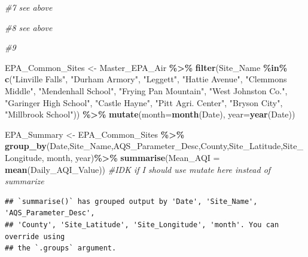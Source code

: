 \documentclass[
]{article}
\newenvironment{Shaded}{\begin{snugshade}}{\end{snugshade}}
\newcommand{\AttributeTok}[1]{\textcolor[rgb]{0.13,0.29,0.53}{#1}}
\newcommand{\CommentTok}[1]{\textcolor[rgb]{0.56,0.35,0.01}{\textit{#1}}}
\newcommand{\FunctionTok}[1]{\textcolor[rgb]{0.13,0.29,0.53}{\textbf{#1}}}
\newcommand{\NormalTok}[1]{#1}
\newcommand{\OtherTok}[1]{\textcolor[rgb]{0.56,0.35,0.01}{#1}}
\newcommand{\SpecialCharTok}[1]{\textcolor[rgb]{0.81,0.36,0.00}{\textbf{#1}}}
\newcommand{\StringTok}[1]{\textcolor[rgb]{0.31,0.60,0.02}{#1}}
\begin{document}
\begin{Shaded}
\begin{Highlighting}[]
\CommentTok{\#7 see above}

\CommentTok{\#8 see above}

\CommentTok{\#9}

\NormalTok{EPA\_Common\_Sites }\OtherTok{\textless{}{-}}\NormalTok{ Master\_EPA\_Air }\SpecialCharTok{\%\textgreater{}\%} 
\FunctionTok{filter}\NormalTok{(Site\_Name }\SpecialCharTok{\%in\%} \FunctionTok{c}\NormalTok{(}\StringTok{"Linville Falls"}\NormalTok{, }\StringTok{"Durham Armory"}\NormalTok{, }\StringTok{"Leggett"}\NormalTok{, }\StringTok{"Hattie Avenue"}\NormalTok{,  }
    \StringTok{"Clemmons Middle"}\NormalTok{, }\StringTok{"Mendenhall School"}\NormalTok{, }\StringTok{"Frying Pan Mountain"}\NormalTok{, }
    \StringTok{"West Johnston Co."}\NormalTok{, }\StringTok{"Garinger High School"}\NormalTok{, }\StringTok{"Castle Hayne"}\NormalTok{, }
    \StringTok{"Pitt Agri. Center"}\NormalTok{, }\StringTok{"Bryson City"}\NormalTok{, }\StringTok{"Millbrook School"}\NormalTok{)) }\SpecialCharTok{\%\textgreater{}\%} 
      \FunctionTok{mutate}\NormalTok{(}\AttributeTok{month=}\FunctionTok{month}\NormalTok{(Date), }\AttributeTok{year=}\FunctionTok{year}\NormalTok{(Date))}


\NormalTok{EPA\_Summary }\OtherTok{\textless{}{-}}\NormalTok{ EPA\_Common\_Sites }\SpecialCharTok{\%\textgreater{}\%} \FunctionTok{group\_by}\NormalTok{(Date,Site\_Name,AQS\_Parameter\_Desc,County,Site\_Latitude,Site\_Longitude, month, year)}\SpecialCharTok{\%\textgreater{}\%} \FunctionTok{summarise}\NormalTok{(}\AttributeTok{Mean\_AQI =} \FunctionTok{mean}\NormalTok{(Daily\_AQI\_Value))  }\CommentTok{\#IDK if I should use mutate here instead of summarize}
\end{Highlighting}
\end{Shaded}

\begin{verbatim}
## `summarise()` has grouped output by 'Date', 'Site_Name', 'AQS_Parameter_Desc',
## 'County', 'Site_Latitude', 'Site_Longitude', 'month'. You can override using
## the `.groups` argument.
\end{verbatim}
\end{document}
